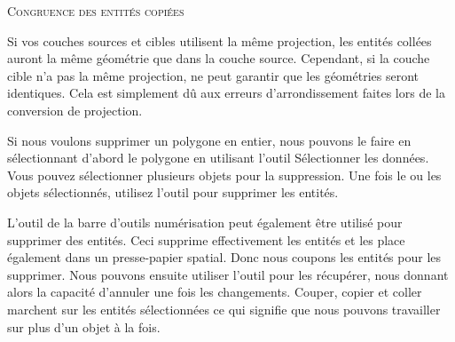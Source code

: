 \begin{Tip}[ht]\caption{\textsc{Congruence des entités copiées}}
Si vos couches sources et cibles utilisent la même projection, les entités collées 
auront la même géométrie que dans la couche source. Cependant, si la couche cible 
n'a pas la même projection, \qg ne peut garantir que les géométries seront 
identiques. Cela est simplement dû aux erreurs d'arrondissement faites lors de 
la conversion de projection.
\end{Tip}


Si nous voulons supprimer un polygone en entier, nous pouvons le faire en 
sélectionnant d'abord le polygone en utilisant l'outil 
{Sélectionner les données}. Vous pouvez sélectionner plusieurs objets pour la 
suppression. Une fois le ou les objets sélectionnés, utilisez l'outil 
 pour supprimer les 
entités.

L'outil  de la barre d'outils 
numérisation peut également être utilisé pour supprimer des entités. Ceci 
supprime effectivement les entités et les place également dans un presse-papier 
spatial. Donc nous coupons les entités pour les supprimer. Nous pouvons ensuite 
utiliser l'outil  pour les 
récupérer, nous donnant alors la capacité d'annuler une fois les changements. 
Couper, copier et coller marchent sur les entités sélectionnées ce qui signifie 
que nous pouvons travailler sur plus d'un objet à la fois.

